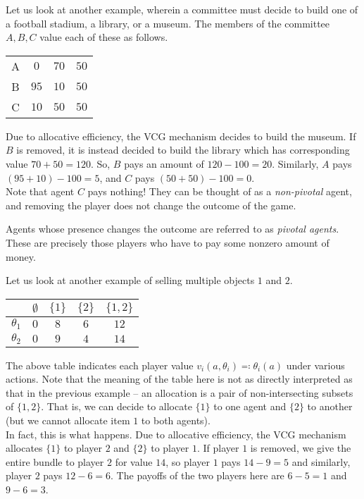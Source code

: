 \begin{fex}
			Let us look at another example, wherein a committee must decide to build one of a football stadium, a library, or a museum. The members of the committee $A,B,C$ value each of these as follows.
			\begin{center}
			\begin{tabular}{|c||c|c|c|}
				\hline
				& \text{Football} & \text{Library} & \text{Museum} \\
				\hline\hline
				A & $0$ & $70$ & $50$ \\
				\hline
				B & $95$ & $10$ & $50$ \\
				\hline
				C & $10$ & $50$ & $50$ \\ \hline
			\end{tabular}
			\end{center}
			Due to allocative efficiency, the VCG mechanism decides to build the museum. If $B$ is removed, it is instead decided to build the library which has corresponding value $70+50 = 120$. So, $B$ pays an amount of $120-100 = 20$. Similarly, $A$ pays $(95+10)-100 = 5$, and $C$ pays $(50+50)-100 = 0$.\\
			Note that agent $C$ pays nothing! They can be thought of as a \emph{non-pivotal} agent, and removing the player does not change the outcome of the game.
		\end{fex}

		Agents whose presence changes the outcome are referred to as \emph{pivotal agents}. These are precisely those players who have to pay some nonzero amount of money.

		\begin{fex}
			Let us look at another example of selling multiple objects $1$ and $2$.
			\begin{center}
			\begin{tabular}{|c||c|c|c|c|}
				\hline
				& $\emptyset$ & $\{1\}$ & $\{2\}$ & $\{1,2\}$ \\
				\hline\hline
				$\theta_1$ & $0$ & $8$ & $6$ & $12$ \\
				\hline
				$\theta_2$ & $0$ & $9$ & $4$ & $14$ \\ \hline
			\end{tabular}
			\end{center}
			The above table indicates each player value $v_i(a,\theta_i) \eqqcolon \theta_i(a)$ under various actions. Note that the meaning of the table here is not as directly interpreted as that in the previous example -- an allocation is a pair of non-intersecting subsets of $\{1,2\}$. That is, we can decide to allocate $\{1\}$ to one agent and $\{2\}$ to another (but we cannot allocate item $1$ to both agents). \\
			In fact, this is what happens. Due to allocative efficiency, the VCG mechanism allocates $\{1\}$ to player $2$ and $\{2\}$ to player $1$. If player $1$ is removed, we give the entire bundle to player $2$ for value $14$, so player $1$ pays $14-9 = 5$ and similarly, player $2$ pays $12-6 = 6$. The payoffs of the two players here are $6-5 = 1$ and $9-6 = 3$.
		\end{fex}

